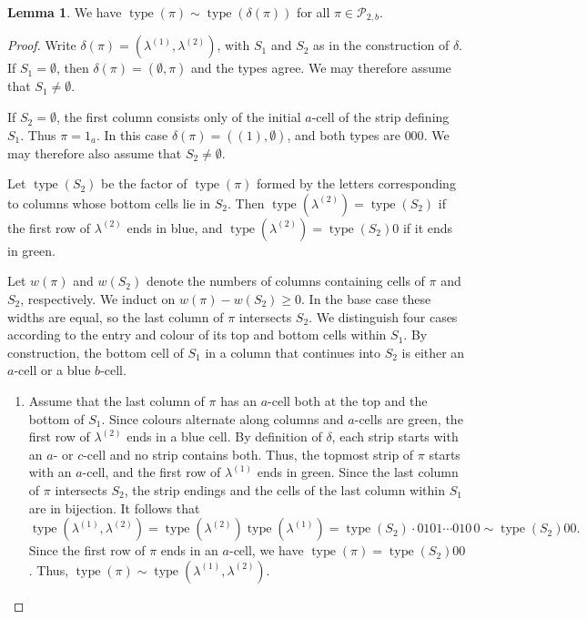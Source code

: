 \documentclass[11pt]{article}
\theoremstyle{definition}
\newtheorem{lemma}[theorem]{Lemma}
\theoremstyle{remark}
\theoremstyle{definition}
\numberwithin{equation}{section}
\newcommand{\type}{\operatorname{type}}
\begin{document}
\begin{lemma}\label{lemma:delta_type}
We have $\type(\pi)\sim\type(\delta(\pi))$ for all $\pi \in \mathcal{P}_{2,b}$.
\end{lemma}
\begin{proof}
Write \(\delta(\pi)=(\lambda^{(1)},\lambda^{(2)})\), with \(S_1\) and \(S_2\) as in the construction of \(\delta\). If \(S_1=\emptyset\), then \(\delta(\pi)=(\emptyset,\pi)\) and the types agree. We may therefore assume that \(S_1\neq\emptyset\).

  If \(S_2=\emptyset\), the first column consists only of the initial \(a\)-cell of the strip defining \(S_1\). Thus \(\pi=1_a\). In this case \(\delta(\pi)=((1),\emptyset)\), and both types are \(000\). We may therefore also assume that \(S_2\neq\emptyset\).

  Let \(\type(S_2)\) be the factor of \(\type(\pi)\) formed by the letters corresponding to columns whose bottom cells lie in \(S_2\). Then \(\type(\lambda^{(2)})=\type(S_2)\) if the first row of \(\lambda^{(2)}\) ends in blue, and \(\type(\lambda^{(2)})=\type(S_2)0\) if it ends in green.

  Let \(w(\pi)\) and \(w(S_2)\) denote the numbers of columns containing cells of \(\pi\) and \(S_2\), respectively. We induct on \(w(\pi)-w(S_2)\geq0\). In the base case these widths are equal, so the last column of \(\pi\) intersects \(S_2\). We distinguish four cases according to the entry and colour of its top and bottom cells within \(S_1\). By construction, the bottom cell of \(S_1\) in a column that continues into \(S_2\) is either an \(a\)-cell or a blue \(b\)-cell.

\begin{enumerate}[label=(1\alph*)]
\item Assume that the last column of \(\pi\) has an \(a\)-cell both at
  the top and the bottom of \(S_1\). Since colours alternate along
  columns and \(a\)-cells are green, the first row of \(\lambda^{(2)}\)
  ends in a blue cell. By definition of \(\delta\), each strip starts
  with an \(a\)- or \(c\)-cell and no strip contains both. Thus, the
  topmost strip of \(\pi\) starts with an \(a\)-cell, and the first
  row of \(\lambda^{(1)}\) ends in green. Since the last column of \(\pi\)
  intersects \(S_2\), the strip endings and the cells of the last
  column within \(S_1\) are in bijection. It follows that
\[
\type(\lambda^{(1)},\lambda^{(2)})=\type(\lambda^{(2)})\type(\lambda^{(1)})=\type(S_2)\cdot0101\cdots010\,0\sim\type(S_2)00.
\]
Since the first row of \(\pi\) ends in an \(a\)-cell, we have
\(\type(\pi)=\type(S_2)00\). Thus,
\(\type(\pi)\sim\type(\lambda^{(1)},\lambda^{(2)})\).


\end{enumerate}
\end{proof}
\end{document}
